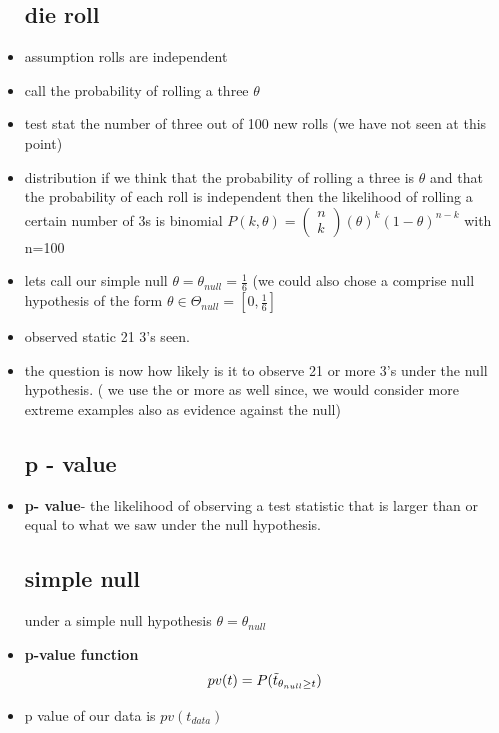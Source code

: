 \documentclass{article}
\begin{document}
\begin{itemize}
\subsection{die roll}
\item assumption rolls are independent 
\item call the probability of rolling a three $\theta$
\item test stat the number of three out of 100 new rolls (we have not seen at this point) 
\item distribution if we think that the probability of rolling a three is $\theta$ and that the probability of each roll is independent then the likelihood of rolling a certain number of 3s is binomial $P(k,\theta)=\begin{pmatrix}n\\k\end{pmatrix}(\theta)^{k}(1-\theta)^{n-k}$ with n=100
\item lets call our simple null $\theta=\theta_{null}=\frac{1}{6}$ (we could also chose a comprise null hypothesis of the form $\theta\in \Theta_{null}=[0,\frac{1}{6}]$
 \item observed static  21 3's seen. 
 \item the question is now how likely is it to observe 21 or more 3's under the null hypothesis. ( we use the or more as well since, we would consider more extreme examples also as evidence against the null) 
 \subsection{p - value}
 \item \textbf{p- value}- the likelihood of observing a test statistic that is larger than or equal to what we saw under the null hypothesis. 
 \subsection{simple null}
 \itme under a simple null hypothesis $\theta=\theta_{null}$
 \item \textbf{p-value function} $$pv(t)=P(\Tilde{t}_{\theta_{null}\geq t})$$
\item p value of our data is $pv(t_{data})$

\end{itemize}
\end{document}

